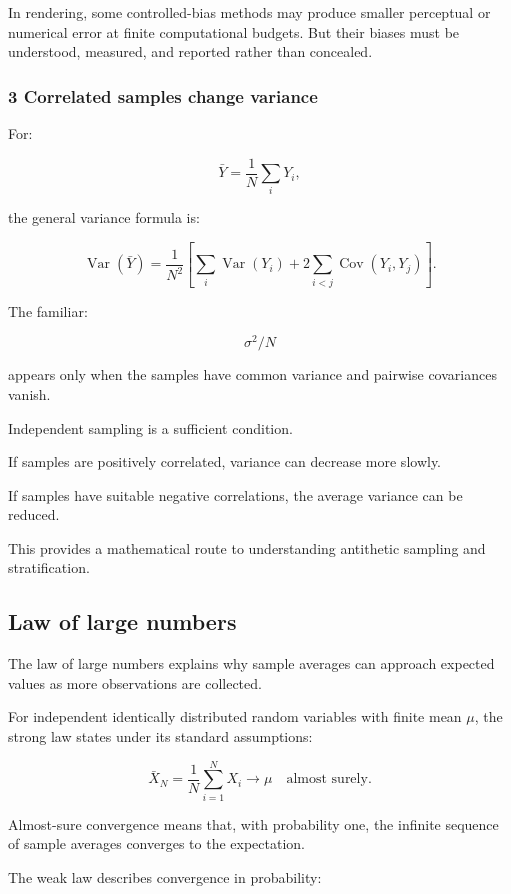 In rendering, some controlled-bias methods may produce smaller perceptual or numerical error at finite computational budgets. But their biases must be understood, measured, and reported rather than concealed.

\subsubsection{3 Correlated samples change variance}\label{02-foundations-ii-ch030-correlated-samples-change-variance}

For:

\[
 \bar Y=\frac1N\sum_iY_i,
\]

the general variance formula is:

\[
 \boxed{ \operatorname{Var}(\bar Y) = \frac1{N^2} \left[ \sum_i\operatorname{Var}(Y_i) + 2\sum_{i<j}\operatorname{Cov}(Y_i,Y_j) \right] }.
\]

The familiar:

\[
 \sigma^2/N
\]

appears only when the samples have common variance and pairwise covariances vanish.

Independent sampling is a sufficient condition.

If samples are positively correlated, variance can decrease more slowly.

If samples have suitable negative correlations, the average variance can be reduced.

This provides a mathematical route to understanding antithetic sampling and stratification.

\subsection{Law of large numbers}\label{02-foundations-ii-ch030-law-of-large-numbers}

The law of large numbers explains why sample averages can approach expected values as more observations are collected.

For independent identically distributed random variables with finite mean \(\mu\), the strong law states under its standard assumptions:

\[
 \boxed{ \bar X_N= \frac1N\sum_{i=1}^NX_i \longrightarrow\mu \quad\text{almost surely} }.
\]

Almost-sure convergence means that, with probability one, the infinite sequence of sample averages converges to the expectation.

The weak law describes convergence in probability:


